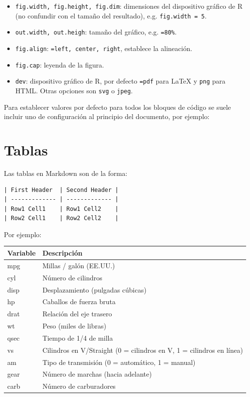 \documentclass[]{book}
\newenvironment{Shaded}{\begin{snugshade}}{\end{snugshade}}
\newcommand{\NormalTok}[1]{#1}
\providecommand{\tightlist}{%
  \setlength{\itemsep}{0pt}\setlength{\parskip}{0pt}}
\theoremstyle{definition}
\theoremstyle{definition}
\theoremstyle{definition}
\theoremstyle{remark}
\begin{document}
\begin{itemize}
\tightlist
\item
  \texttt{fig.width,\ fig.height,\ fig.dim}: dimensiones del dispositivo
  gráfico de R (no confundir con el tamaño del resultado), e.g.
  \texttt{fig.width\ =\ 5}.
\item
  \texttt{out.width,\ out.heigh}: tamaño del gráfico, e.g.
  \texttt{=\textquotesingle{}80\%\textquotesingle{}}.
\item
  \texttt{fig.align}:
  \texttt{=\textquotesingle{}left\textquotesingle{},\ \textquotesingle{}center\textquotesingle{},\ \textquotesingle{}right\textquotesingle{}},
  establece la alineación.
\item
  \texttt{fig.cap}: leyenda de la figura.
\item
  \texttt{dev}: dispositivo gráfico de R, por defecto
  \texttt{=\textquotesingle{}pdf\textquotesingle{}} para LaTeX y
  \texttt{\textquotesingle{}png\textquotesingle{}} para HTML. Otras
  opciones son \texttt{\textquotesingle{}svg\textquotesingle{}} o
  \texttt{\textquotesingle{}jpeg\textquotesingle{}}.
\end{itemize}

Para establecer valores por defecto para todos los bloques de código se
suele incluir uno de configuración al principio del documento, por
ejemplo:

\begin{Shaded}
\end{Shaded}

\section{Tablas}\label{tablas}

Las tablas en Markdown son de la forma:

\begin{verbatim}
| First Header  | Second Header |
| ------------- | ------------- |
| Row1 Cell1    | Row1 Cell2    |
| Row2 Cell1    | Row2 Cell2    |
\end{verbatim}

Por ejemplo:

\begin{longtable}[]{@{}ll@{}}
\toprule
Variable & Descripción\tabularnewline
\midrule
\endhead
mpg & Millas / galón (EE.UU.)\tabularnewline
cyl & Número de cilindros\tabularnewline
disp & Desplazamiento (pulgadas cúbicas)\tabularnewline
hp & Caballos de fuerza bruta\tabularnewline
drat & Relación del eje trasero\tabularnewline
wt & Peso (miles de libras)\tabularnewline
qsec & Tiempo de 1/4 de milla\tabularnewline
vs & Cilindros en V/Straight (0 = cilindros en V, 1 = cilindros en
línea)\tabularnewline
am & Tipo de transmisión (0 = automático, 1 = manual)\tabularnewline
gear & Número de marchas (hacia adelante)\tabularnewline
carb & Número de carburadores\tabularnewline
\bottomrule
\end{longtable}
\end{document}
